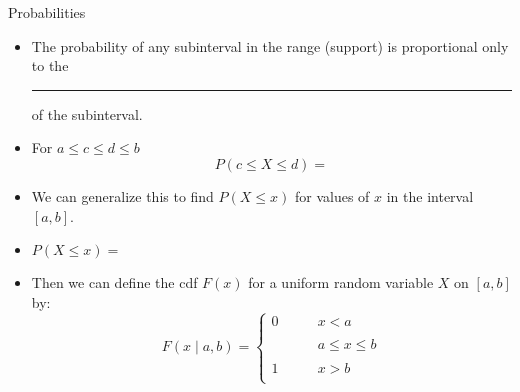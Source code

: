 \documentclass{article}
\newcommand{\blankul}[1]{\rule[-1.5mm]{#1}{0.15mm}}	%
\begin{document}
\newpage

Probabilities\bigskip
\begin{itemize}
    \item The probability of any subinterval in the range (support) is proportional only to the \blankul{2cm} of the subinterval.\bigskip
    \item For $a \le c \le d \le b$
    \[P(c \le X \le d) = \]\bigskip
    \item We can generalize this to find $P(X \le x)$ for values of $x$ in the interval $[a,b]$.
    \item[] $P(X \le x) = $\vspace{20pt}
    \item Then we can define the cdf $F(x)$ for a uniform random variable $X$ on $[a,b]$ by:
    \[
    F(x \mid a, b) =
        \left\{
        \begin{array}{ll}
            0 & \quad\quad x < a\\\\
             & \quad\quad a \le x \le b\\\\
            1 & \quad\quad x > b\\
        \end{array}
        \right.
    \]
\end{itemize}\bigskip
\end{document}

